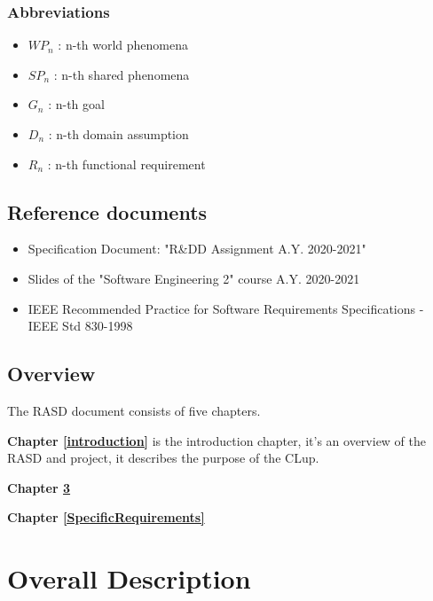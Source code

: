\documentclass[a4paper,12pt]{book}
\begin{document}
\subsection{Abbreviations}

\begin{itemize}
	\item  $WP_n$ : n-th world phenomena
	\item  $SP_n$ : n-th shared phenomena
	\item  $G_n$ : n-th goal
	\item  $D_n$ : n-th domain assumption
	\item  $R_n$ : n-th functional requirement
\end{itemize}


\section{Reference documents}

\begin{itemize}
	\item Specification Document: "R\&DD Assignment A.Y. 2020-2021"
	\item Slides of the "Software Engineering 2" course A.Y. 2020-2021
	\item IEEE Recommended Practice for Software Requirements Specifications - IEEE Std 830-1998
\end{itemize}
	
\section{Overview}
The RASD document consists of five chapters.

\textbf{Chapter \ref{introduction}} is the introduction chapter, it's an overview of the RASD and project, 
it describes the purpose of the CLup.

\textbf{Chapter \ref{OverallDescription}} 

\textbf{Chapter \ref{SpecificRequirements}} 

















\chapter{Overall Description} \label{OverallDescription}
\end{document}
